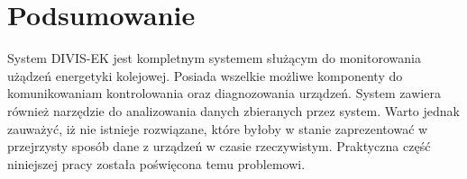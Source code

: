 \section{Podsumowanie}
System DIVIS-EK jest kompletnym systemem służącym do monitorowania użądzeń energetyki kolejowej. Posiada wszelkie możliwe komponenty do komunikowaniam kontrolowania oraz diagnozowania urządzeń. System zawiera również narzędzie do analizowania danych zbieranych przez system. Warto jednak zauważyć, iż nie istnieje rozwiązane, które byłoby w stanie zaprezentować w przejrzysty sposób dane z urządzeń w czasie rzeczywistym. Praktyczna część niniejszej pracy została poświęcona temu problemowi.